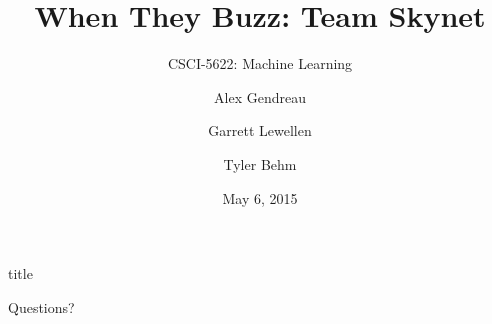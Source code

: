 \documentclass[notes]{beamer}
\begin{document}
\title{When They Buzz: Team Skynet}
\subtitle{CSCI-5622: Machine Learning}
\author{Alex Gendreau \and Garrett Lewellen \and Tyler Behm }
\date{May 6, 2015}

\frame{\titlepage}

\begin{frame}{title}

\end{frame}



\begin{frame}
	\begin{center}
		Questions?
	\end{center}
\end{frame}
\end{document}
